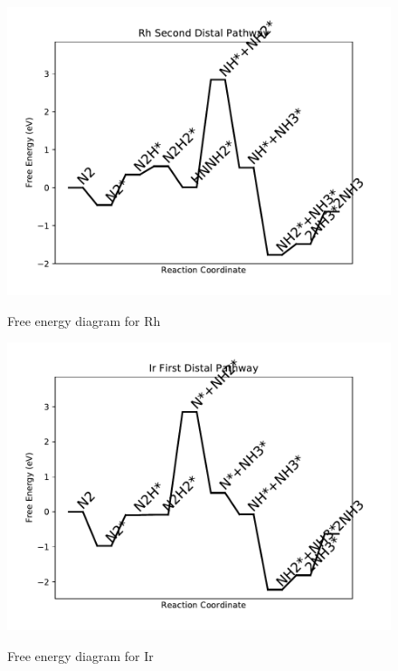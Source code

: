 \documentclass[journal=jacsat,manuscript=article]{achemso}
\begin{document}
\begin{figure}
\includegraphics[width=1\linewidth]{data/plots/Rh_distal_2.pdf}
\label{fig:Rh_distal_2}
\caption{Free energy diagram for Rh}
\end{figure}

\newpage
\begin{figure}
\includegraphics[width=1\linewidth]{data/plots/Ir_distal_1.pdf}
\label{fig:Ir_distal_1}
\caption{Free energy diagram for Ir}
\end{figure}
\end{document}
